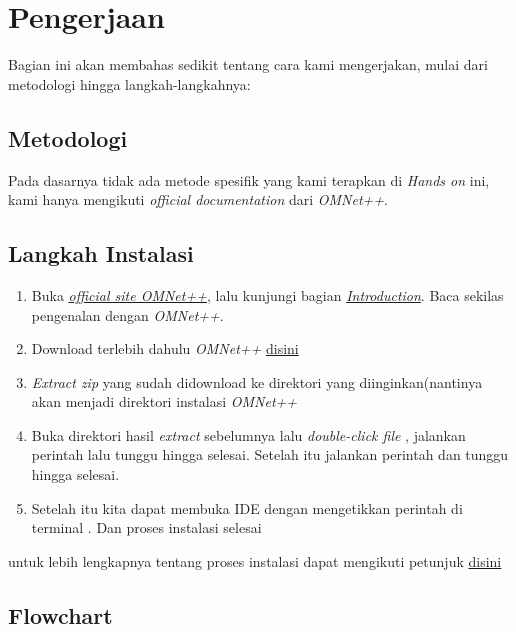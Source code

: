 \documentclass[conference]{IEEEtran}
\begin{document}
\section{Pengerjaan}\label{pengerjaan}
Bagian ini akan membahas sedikit tentang cara kami mengerjakan, mulai dari metodologi hingga langkah-langkahnya:

\subsection{Metodologi}
Pada dasarnya tidak ada metode spesifik yang kami terapkan di \textit{Hands on} ini, kami hanya mengikuti \textit{official documentation} dari \textit{OMNet++}.

\subsection{Langkah Instalasi}
\begin{enumerate}
  \item Buka \href{https://omnetpp.org/}{\textit{official site OMNet++}}, lalu kunjungi bagian \href{https://omnetpp.org/intro}{\textit{Introduction}}. Baca sekilas pengenalan dengan \textit{OMNet++}.
  \item Download terlebih dahulu \textit{OMNet++} \href{https://omnetpp.org/download/}{disini}
  \item \textit{Extract zip} yang sudah didownload ke direktori yang diinginkan(nantinya akan menjadi direktori instalasi \textit{OMNet++}
  \item Buka direktori hasil \textit{extract} sebelumnya lalu \textit{double-click file} , jalankan perintah  lalu tunggu hingga selesai. Setelah itu jalankan perintah  dan tunggu hingga selesai.
  \item Setelah itu kita dapat membuka IDE dengan mengetikkan perintah  di terminal . Dan proses instalasi selesai
\end{enumerate}

untuk lebih lengkapnya tentang proses instalasi dapat mengikuti petunjuk \href{https://doc.omnetpp.org/omnetpp/InstallGuide.pdf}{disini}


\subsection{Flowchart}
\end{document}
